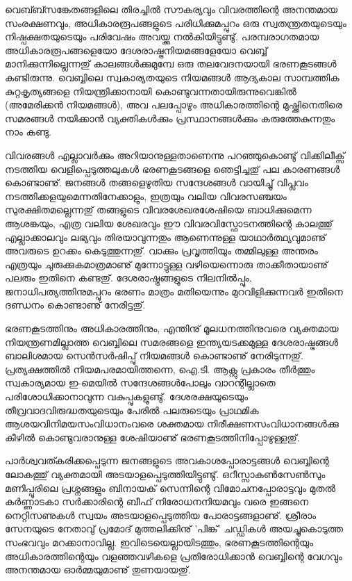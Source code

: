 വെബ്ബ്സങ്കേതങ്ങളിലെ തിരച്ചില്‍ സൗകര്യവും വിവരത്തിന്റെ അനന്തമായ സംരക്ഷണവും, അധികാരരൂപങ്ങളുടെ പരിധിക്കുമപ്പുറം
 ഒരു സ്വതന്ത്രതയുടെയും നിഷ്പക്ഷതയുടെയും പരിവേഷം അവയ്ക്കു നല്‍കിയിട്ടുണ്ടു്. പരമ്പരാഗതമായ അധികാരരൂപങ്ങളെയോ 
ദേശരാഷ്ട്രനിയമങ്ങളേയോ വെബ്ബ് മാനിക്കുന്നില്ലെന്നതു് കാലങ്ങള്‍ക്കുമുമ്പേ ഒരു തലവേദനയായി ഭരണകൂടങ്ങള്‍ 
കണ്ടിരുന്നു. വെബ്ബിലെ സ്വകാര്യതയുടെ നിയമങ്ങള്‍ ആദ്യകാല സാമ്പത്തിക കുറ്റകൃത്യങ്ങളെ നിയന്ത്രിക്കാനായി 
കൊണ്ടുവന്നതായിരുന്നുവെങ്കില്‍ (അമേരിക്കന്‍ നിയമങ്ങള്‍), അവ പലപ്പോഴും അധികാരത്തിന്റെ മുഷ്ക്കിനെതിരെ സമരങ്ങള്‍ 
നയിക്കാന്‍ വ്യക്തികള്‍ക്കും പ്രസ്ഥാനങ്ങള്‍ക്കും കരുത്തേകുന്നതും നാം കണ്ടു.

വിവരങ്ങള്‍ എല്ലാവര്‍ക്കും അറിയാനുള്ളതാണെന്നു പറഞ്ഞുകൊണ്ടു് വിക്കിലീക്സ് നടത്തിയ വെളിപ്പെടുത്തലുകള്‍ ഭരണകൂടങ്ങളെ 
ഞെട്ടിച്ചതു് പല കാരണങ്ങള്‍ കൊണ്ടാണു്. ജനങ്ങള്‍ തങ്ങളെഴുതിയ സന്ദേശങ്ങള്‍ വായിച്ചു് വിപ്ലവം നടത്തിക്കളയുമെന്നതിനേക്കാളും,
 ഇത്രയും വലിയ വിവരസഞ്ചയം സുരക്ഷിതമല്ലെന്നതു് തങ്ങളുടെ വിവരശേഖരശേഷിയെ ബാധിക്കുമെന്ന ആശങ്കയും, എത്ര വലിയ 
ശേഖരവും ഈ വിവരവിസ്ഫോടനത്തിന്റെ കാലത്തു് എല്ലാക്കാലവും ലഭ്യവും തിരയാവുന്നതും ആണെന്നുള്ള യാഥാര്‍ത്ഥ്യവുമാണു് അവരുടെ ഉറക്കം കെടുത്തുന്നതു്. വാക്കും
 പ്രവൃത്തിയും തമ്മിലുള്ള അന്തരം എത്രയും ചുരുക്കുകമാത്രമാണു് മുന്നോട്ടുള്ള വഴിയെന്നൊരു താക്കീതായാണു് പലരും ഇതിനെ 
കണ്ടതു്. ദേശരാഷ്ട്രങ്ങളുടെ നിലനില്‍പ്പും, ജനാധിപത്യത്തിനുമപ്പുറം ഭരണം മാത്രം മതിയെന്നും മുറവിളിക്കുന്നവര്‍ ഇതിനെ ദണ്ഡനം 
കൊണ്ടാണു് നേരിട്ടതു്.

ഭരണകൂടത്തിനും അധികാരത്തിനും, എന്തിനു് മൂലധനത്തിനുവരെ വ്യക്തമായ നിയന്ത്രണമില്ലാത്ത വെബ്ബിലെ സമരങ്ങളെ 
ഇന്ത്യയടക്കമുള്ള ദേശരാഷ്ട്രങ്ങള്‍ ബാലിശമായ സെന്‍സര്‍ഷിപ്പു് നിയമങ്ങള്‍ കൊണ്ടാണു് നേരിടുന്നതു്. പ്രത്യക്ഷത്തില്‍ 
നിയമപരമായിത്തന്നെ, ഐ.ടി. ആക്റ്റു പ്രകാരം തീര്‍ത്തും സ്വകാര്യമായ ഇ-മെയില്‍ സന്ദേശങ്ങള്‍പോലും വാറന്റില്ലാതെ 
പരിശോധിക്കാനാവുന്ന വകുപ്പുകളുണ്ടു്. ദേശരക്ഷയുടെയും തീവ്രവാദവിരുദ്ധതയുടെയും പേരില്‍ പലരുടെയും പ്രാഥമിക 
ആശയവിനിമയസംവിധാനംവരെ ശക്തമായ നിരീക്ഷണസംവിധാനങ്ങള്‍ക്കു കീഴില്‍ കൊണ്ടുവരാനുള്ള ശേഷിയാണു് 
ഭരണകൂടത്തിനിപ്പോഴുള്ളതു്.

പാര്‍ശ്വവത്കരിക്കപ്പെടുന്ന ജനങ്ങളുടെ അവകാശപ്പോരാട്ടങ്ങള്‍ വെബ്ബിന്റെ ലോകത്തു് വ്യക്തമായി അടയാളപ്പെടുത്തിയിട്ടുണ്ടു്. 
ഒറീസ്സാകണ്‍സേണ്‍സും മണിപ്പൂരിലെ പ്രശ്നങ്ങളും ബിനായക് സെന്നിന്റെ വിമോചനപ്പോരാട്ടവും മുതല്‍ കര്‍ണ്ണാടകാ 
സര്‍ക്കാരിന്റെ ബീഫ് നിരോധനനിയമവും വരെ ഇങ്ങനെ നെറ്റിസണുകള്‍ സ്വയം അടയാളപ്പെടുത്തിയ പോരാട്ടങ്ങളാണു്. 
ശ്രീരാം സേനയുടെ നേതാവു് പ്രമോദ് മുത്തലിക്കിനു് 'പിങ്ക്' ചഡ്ഡികള്‍ അയച്ചുകൊടുത്ത സംഭവവും മറക്കാനാവില്ല. 
ഇവിടെയെല്ലായിടത്തും, ഭരണകൂടത്തിന്റെയും അധികാരത്തിന്റെയും വളഞ്ഞവഴികളെ പ്രതിരോധിക്കാന്‍ വെബ്ബിന്റെ വേഗവും 
അനന്തമായ ഓര്‍മ്മയുമാണു് തുണയായതു്.

